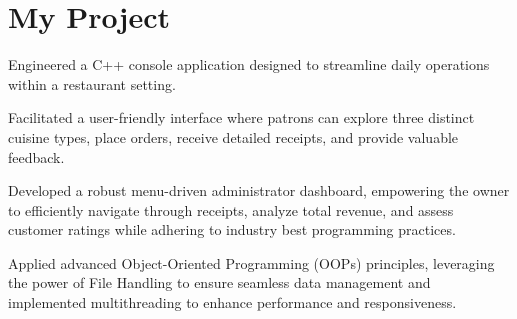 \chapter{My Project}
\hypertarget{index}{}\label{index}
\label{index_md__2_users_2shubham_2_desktop_2dev_2_c_09_09_2_r_e_a_d_m_e}%
%
 Engineered a C++ console application designed to streamline daily operations within a restaurant setting.

Facilitated a user-\/friendly interface where patrons can explore three distinct cuisine types, place orders, receive detailed receipts, and provide valuable feedback.

Developed a robust menu-\/driven administrator dashboard, empowering the owner to efficiently navigate through receipts, analyze total revenue, and assess customer ratings while adhering to industry best programming practices.

Applied advanced Object-\/\+Oriented Programming (OOPs) principles, leveraging the power of File Handling to ensure seamless data management and implemented multithreading to enhance performance and responsiveness. 